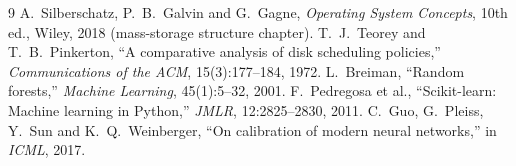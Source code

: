 \documentclass[10pt,a4paper]{article}
\begin{document}
\begin{thebibliography}{9}\small
{} A.~Silberschatz, P.~B.~Galvin and G.~Gagne, \emph{Operating System Concepts}, 10th ed., Wiley, 2018 (mass-storage structure chapter).
 T.~J.~Teorey and T.~B.~Pinkerton, ``A comparative analysis of disk scheduling policies,'' \emph{Communications of the ACM}, 15(3):177--184, 1972.
 L.~Breiman, ``Random forests,'' \emph{Machine Learning}, 45(1):5--32, 2001.
 F.~Pedregosa et al., ``Scikit-learn: Machine learning in Python,'' \emph{JMLR}, 12:2825--2830, 2011.
 C.~Guo, G.~Pleiss, Y.~Sun and K.~Q.~Weinberger, ``On calibration of modern neural networks,'' in \emph{ICML}, 2017.
\end{thebibliography}
\end{document}
